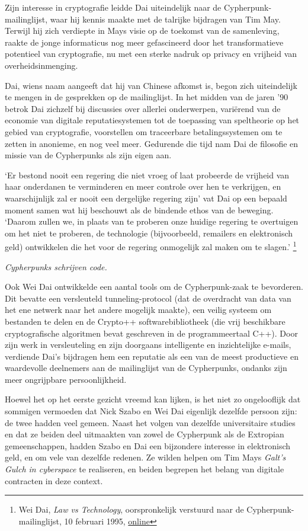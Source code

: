 \documentclass[
  a5paper,
  smalldemyvopaper,11pt,twoside,onecolumn,openright,extrafontsizes,
hidelinks]{memoir}
\begin{document}
Zijn interesse in cryptografie leidde Dai uiteindelijk naar de
Cypherpunk-mailinglijst, waar hij kennis maakte met de talrijke
bijdragen van Tim May. Terwijl hij zich verdiepte in Mays visie op de
toekomst van de samenleving, raakte de jonge informaticus nog meer
gefascineerd door het transformatieve potentieel van cryptografie, nu
met een sterke nadruk op privacy en vrijheid van overheidsinmenging.

Dai, wiens naam aangeeft dat hij van Chinese afkomst is, begon zich
uiteindelijk te mengen in de gesprekken op de mailinglijst. In het
midden van de jaren '90 betrok Dai zichzelf bij discussies over allerlei
onderwerpen, variërend van de economie van digitale reputatiesystemen
tot de toepassing van speltheorie op het gebied van cryptografie,
voorstellen om traceerbare betalingssystemen om te zetten in anonieme,
en nog veel meer. Gedurende die tijd nam Dai de filosofie en missie van de Cypherpunks als
zijn eigen aan.

`Er bestond nooit een regering die niet vroeg of laat probeerde de
vrijheid van haar onderdanen te verminderen en meer controle over hen te
verkrijgen, en waarschijnlijk zal er nooit een dergelijke regering zijn'
vat Dai op een bepaald moment samen wat hij beschouwt als de bindende
ethos van de beweging. `Daarom zullen we, in plaats van te proberen onze
huidige regering te overtuigen om het niet te proberen, de technologie
(bijvoorbeeld, remailers en elektronisch geld) ontwikkelen die het voor
de regering onmogelijk zal maken om te slagen.' \footnote{Wei Dai,
  \emph{Law vs Technology}, oorspronkelijk verstuurd naar de
  Cypherpunk-mailinglijst, 10 februari 1995,
  \href{https://cypherpunks.venona.com/date/1995/02/msg00508.html}{online}}

\emph{Cypherpunks schrijven code.}

Ook Wei Dai ontwikkelde een aantal tools om de Cypherpunk-zaak te
bevorderen. Dit bevatte een versleuteld tunneling-protocol (dat de
overdracht van data van het ene netwerk naar het andere mogelijk
maakte), een veilig systeem om bestanden te delen en de Crypto++
softwarebibliotheek (die vrij beschikbare cryptografische algoritmen
bevat geschreven in de programmeertaal C++). Door zijn werk in
versleuteling en zijn doorgaans intelligente en inzichtelijke e-mails,
verdiende Dai's bijdragen hem een reputatie als een van de meest
productieve en waardevolle deelnemers aan de mailinglijst van de
Cypherpunks, ondanks zijn meer ongrijpbare persoonlijkheid.

Hoewel het op het eerste gezicht vreemd kan lijken, is het niet zo
ongelooflijk dat sommigen vermoeden dat Nick Szabo en Wei Dai eigenlijk
dezelfde persoon zijn: de twee hadden veel gemeen. Naast het volgen van
dezelfde universitaire studies en dat ze beiden deel uitmaakten van
zowel de Cypherpunk als de Extropian gemeenschappen, hadden Szabo en Dai
een bijzondere interesse in elektronisch geld, en om vele van dezelfde
redenen. Ze wilden helpen om Tim Mays \emph{Galt's Gulch in cyberspace}
te realiseren, en beiden begrepen het belang van digitale contracten in
deze context.
\end{document}
